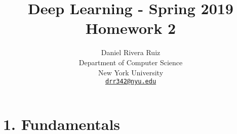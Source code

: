 \documentclass{article}
\title{Deep Learning - Spring 2019\\
       \Large Homework 2}
\author{
  Daniel Rivera Ruiz\\
  Department of Computer Science\\
  New York University\\
  \href{mailto:drr342@nyu.edu}{\texttt{drr342@nyu.edu}}\\
}
\begin{document}
\maketitle



\section*{1. Fundamentals}
\end{document}
